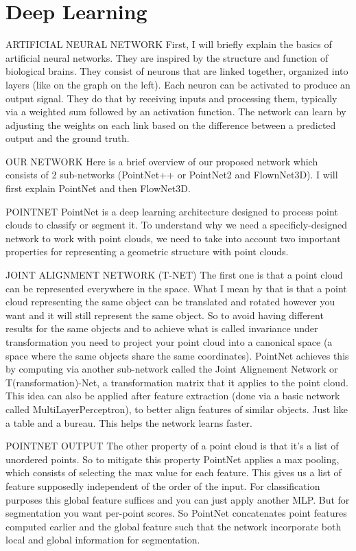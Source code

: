 \section{Deep Learning}
ARTIFICIAL NEURAL NETWORK
First, I will briefly explain the basics of artificial neural networks. They are inspired by the structure and function of biological brains. They consist of neurons that are linked together, organized into layers (like on the graph on the left). Each neuron can be activated to produce an output signal. They do that by receiving inputs and processing them, typically via a weighted sum followed by an activation function. The network can learn by adjusting the weights on each link based on the difference between a predicted output and the ground truth.

OUR NETWORK
Here is a brief overview of our proposed network which consists of 2 sub-networks (PointNet++ or PointNet2 and FlownNet3D). I will first explain PointNet and then FlowNet3D.

POINTNET
PointNet is a deep learning architecture designed to process point clouds to classify or segment it. To understand why we need a specificly-designed network to work with point clouds, we need to take into account two important properties for representing a geometric structure with point clouds. 

JOINT ALIGNMENT NETWORK (T-NET)
The first one is that a point cloud can be represented everywhere in the space. What I mean by that is that a point cloud representing the same object can be translated and rotated however you want and it will still represent the same object. So to avoid having different results for the same objects and to achieve what is called invariance under transformation you need to project your point cloud into a canonical space (a space where the same objects share the same coordinates). PointNet achieves this by computing via another sub-network called the Joint Alignement Network or T(ransformation)-Net, a transformation matrix that it applies to the point cloud.\\
This idea can also be applied after feature extraction (done via a basic network called MultiLayerPerceptron), to better align features of similar objects. Just like a table and a bureau. This helps the network learns faster.

POINTNET OUTPUT
The other property of a point cloud is that it's a list of unordered points. So to mitigate this property PointNet applies a max pooling, which consists of selecting the max value for each feature. This gives us a list of feature supposedly independent of the order of the input. For classification purposes this global feature suffices and you can just apply another MLP. But for segmentation you want per-point scores. So PointNet concatenates point features computed earlier and the global feature such that the network incorporate both local and global information for segmentation.

